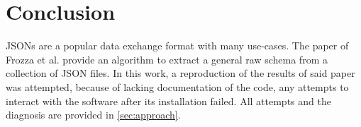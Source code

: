 \documentclass[sigconf, nonacm]{acmart}
\begin{document}
\section{Conclusion}

JSONs are a popular data exchange format with many use-cases. The paper of Frozza et al. \cite{SchemaExtraction} provide an algorithm to extract a general raw schema from a collection of JSON files. In this work, a reproduction of the results of said paper was attempted, because of lacking documentation of the code, any attempts to interact with the software after its installation failed. All attempts and the diagnosis are provided in \autoref{sec:approach}.




\end{document}
